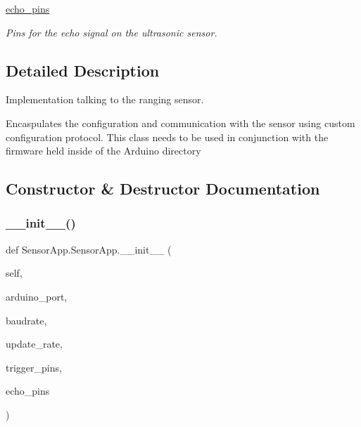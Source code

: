 \begin{DoxyCompactItemize}
\mbox{\label{class_sensor_app_1_1_sensor_app_a1e393f1f58d859a71a34c53849929e7c}} 
\mbox{\hyperlink{class_sensor_app_1_1_sensor_app_a1e393f1f58d859a71a34c53849929e7c}{echo\+\_\+pins}}
\begin{DoxyCompactList}\small\item\em Pins for the echo signal on the ultrasonic sensor. \end{DoxyCompactList}\end{DoxyCompactItemize}


\subsection{Detailed Description}
Implementation talking to the ranging sensor. 

Encaspulates the configuration and communication with the sensor using custom configuration protocol. This class needs to be used in conjunction with the firmware held inside of the Arduino directory 

\subsection{Constructor \& Destructor Documentation}
\mbox{\label{class_sensor_app_1_1_sensor_app_ad925f61b0da07144eda6b3d313087d2e}} 
\subsubsection{\texorpdfstring{\+\_\+\+\_\+init\+\_\+\+\_\+()}{\_\_init\_\_()}}
{\footnotesize\ttfamily def Sensor\+App.\+Sensor\+App.\+\_\+\+\_\+init\+\_\+\+\_\+ (\begin{DoxyParamCaption}\item[{}]{self,  }\item[{}]{arduino\+\_\+port,  }\item[{}]{baudrate,  }\item[{}]{update\+\_\+rate,  }\item[{}]{trigger\+\_\+pins,  }\item[{}]{echo\+\_\+pins }\end{DoxyParamCaption})}



